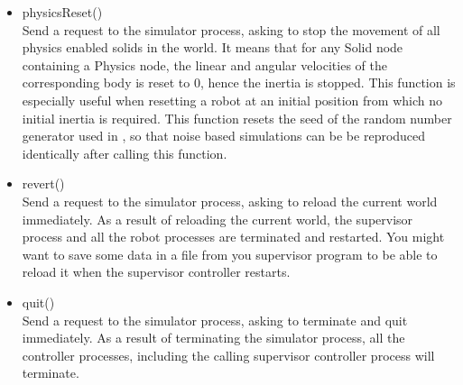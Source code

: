 \begin{itemize}
\item physicsReset() \\
  Send a request to the simulator process, asking to stop the movement
  of all physics enabled solids in the world. It means that for any
  Solid node containing a Physics node, the linear and angular
  velocities of the corresponding body is reset to 0, hence the
  inertia is stopped. This function is especially useful when
  resetting a robot at an initial position from which no initial
  inertia is required.  This function resets the seed of the random
  number generator used in \webots, so that noise based simulations
  can be be reproduced identically after calling this function.

\item revert() \\
  Send a request to the simulator process, asking to reload the
  current world immediately. As a result of reloading the current
  world, the supervisor process and all the robot processes are
  terminated and restarted. You might want to save some data in a file
  from you supervisor program to be able to reload it when the
  supervisor controller restarts.

\item quit() \\
  Send a request to the simulator process, asking to terminate and
  quit immediately. As a result of terminating the simulator process,
  all the controller processes, including the calling supervisor
  controller process will terminate.
\end{itemize}





